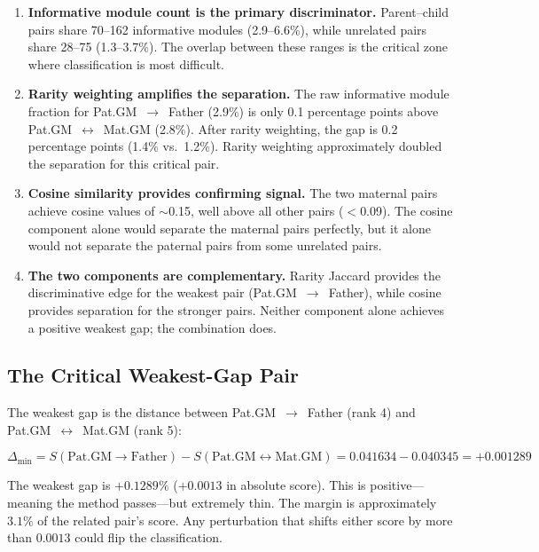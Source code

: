 \documentclass{../yalumba}
\begin{document}
\begin{enumerate}
  \item \textbf{Informative module count is the primary discriminator.}
        Parent--child pairs share 70--162 informative modules (2.9--6.6\%),
        while unrelated pairs share 28--75 (1.3--3.7\%).  The overlap
        between these ranges is the critical zone where classification is
        most difficult.

  \item \textbf{Rarity weighting amplifies the separation.}  The raw
        informative module fraction for Pat.GM~$\to$~Father (2.9\%) is only
        0.1 percentage points above Pat.GM~$\leftrightarrow$~Mat.GM (2.8\%).
        After rarity weighting, the gap is 0.2 percentage points (1.4\% vs.\
        1.2\%).  Rarity weighting approximately doubled the separation for
        this critical pair.

  \item \textbf{Cosine similarity provides confirming signal.}  The two
        maternal pairs achieve cosine values of $\sim$0.15, well above all
        other pairs ($<$0.09).  The cosine component alone would separate
        the maternal pairs perfectly, but it alone would not separate the
        paternal pairs from some unrelated pairs.

  \item \textbf{The two components are complementary.}  Rarity Jaccard
        provides the discriminative edge for the weakest pair
        (Pat.GM~$\to$~Father), while cosine provides separation for the
        stronger pairs.  Neither component alone achieves a positive weakest
        gap; the combination does.
\end{enumerate}

\subsection{The Critical Weakest-Gap Pair}
\label{sec:weakest-gap}

The weakest gap is the distance between Pat.GM~$\to$~Father (rank 4) and
Pat.GM~$\leftrightarrow$~Mat.GM (rank 5):

\begin{equation}
  \Delta_{\min} = S(\text{Pat.GM} \to \text{Father})
               - S(\text{Pat.GM} \leftrightarrow \text{Mat.GM})
               = 0.041634 - 0.040345 = +0.001289
  \label{eq:actual-gap}
\end{equation}

\begin{keyfinding}
The weakest gap is $+0.1289\%$ ($+0.0013$ in absolute score).  This is
positive---meaning the method passes---but extremely thin.  The margin is
approximately $3.1\%$ of the related pair's score.  Any perturbation that
shifts either score by more than $0.0013$ could flip the classification.
\end{keyfinding}
\end{document}
